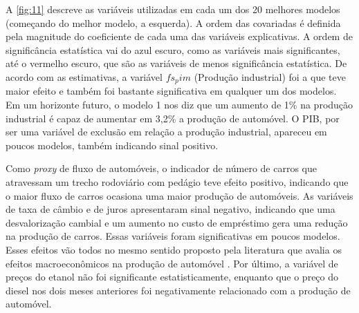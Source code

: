 \documentclass[
article, %
12pt, %
oneside, %
a4paper, %
portuguese, %
portuguese %
]{abntex2}
\begin{document}





A \autoref{fig:11} descreve as variáveis utilizadas em cada um dos 20 melhores modelos (começando do melhor modelo, a esquerda). A ordem das covariadas é definida pela magnitude do coeficiente de cada uma das variáveis explicativas. A ordem de significância estatística vai do azul escuro, como as variáveis mais significantes, até o vermelho escuro, que são as variáveis de menos significância estatística. De acordo com as estimativas, a variável \textit{$fs_pim$} (Produção industrial) foi a que teve maior efeito e também foi bastante significativa em qualquer um dos modelos. Em um horizonte futuro, o modelo 1 nos diz que um aumento de 1\% na produção industrial é capaz de aumentar em 3,2\% a produção de automóvel. O PIB, por ser uma variável de exclusão em relação a produção industrial, apareceu em poucos modelos, também indicando sinal positivo.

Como \textit{proxy} de fluxo de automóveis, o indicador de número de carros que atravessam um trecho rodoviário com pedágio teve efeito positivo, indicando que o maior fluxo de carros ocasiona uma maior produção de automóveis. As variáveis de taxa de câmbio e de juros apresentaram sinal negativo, indicando que uma desvalorização cambial e um aumento no custo de empréstimo gera uma redução na produção de carros. Essas variáveis foram significativas em poucos modelos. Esses efeitos vão todos no mesmo sentido proposto pela literatura que avalia os efeitos macroeconômicos na produção de automóvel \cite{ramey2004tracking,nawi2013determinants,muhammad2013relationship,verissimo2015desempenho,islam2016analysis}. Por último, a variável de preços do etanol não foi significante estatisticamente, enquanto que o preço do diesel nos dois meses anteriores foi negativamente relacionado com a produção de automóvel. 
\end{document}
